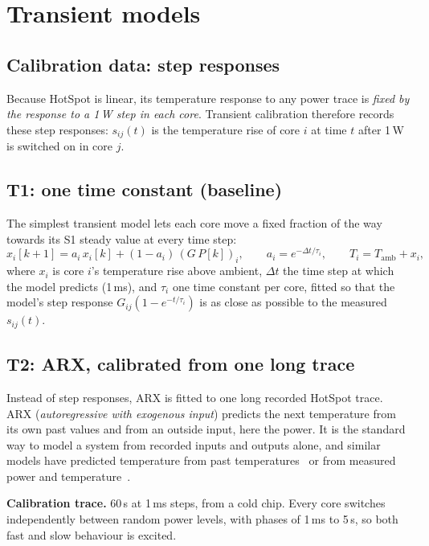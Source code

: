 \documentclass[11pt,a4paper]{article}
\begin{document}
\section{Transient models}\label{sec:models}

\subsection{Calibration data: step responses}\label{sec:steps}
Because HotSpot is linear, its temperature response to any power trace is \emph{fixed by the
response to a 1\,W step in each core}. Transient calibration therefore records these step
responses: $s_{ij}(t)$ is the temperature rise of core $i$ at time $t$ after 1\,W is switched on in
core $j$.

\subsection{T1: one time constant (baseline)}
The simplest transient model lets each core move a fixed fraction of the way towards its S1
steady value at every time step:
\begin{equation}
  x_i[k+1] = a_i\, x_i[k] + (1 - a_i)\,(G\,P[k])_i, \qquad a_i = e^{-\Delta t/\tau_i},
  \qquad T_i = T_\text{amb} + x_i,
  \label{eq:t1}
\end{equation}
where $x_i$ is core $i$'s temperature rise above ambient, $\Delta t$ the time step at which the
model predicts (1\,ms), and $\tau_i$ one time constant per core, fitted so that the model's step
response $G_{ij}(1 - e^{-t/\tau_i})$ is as close as possible to the measured $s_{ij}(t)$.

\subsection{T2: ARX, calibrated from one long trace}\label{sec:arx}
Instead of step responses, ARX is fitted to one long recorded HotSpot trace. ARX (\emph{autoregressive with exogenous input}) predicts the
next temperature from its own past values and from an outside input, here the power. It is the
standard way to
model a system from recorded inputs and outputs alone, and similar models have predicted
temperature from past temperatures~\cite{coskun09} or from measured power and
temperature~\cite{singla15}.

\textbf{Calibration trace.} 60\,s at 1\,ms steps, from a cold chip.
Every core switches independently between random power levels, with phases of 1\,ms to 5\,s, so
both fast and slow behaviour is excited.
\end{document}
